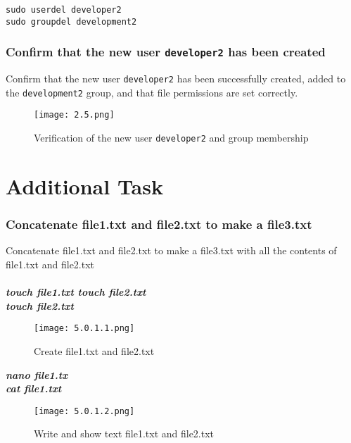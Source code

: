\documentclass[12pt]{article}
\begin{document}
\begin{verbatim}
sudo userdel developer2
sudo groupdel development2
\end{verbatim}

\subsubsection{Confirm that the new user \texttt{developer2} has been created}
Confirm that the new user \texttt{developer2} has been successfully created, added to the \texttt{development2} group, and that file permissions are set correctly.

\begin{figure}[H] %
    \centering
    \texttt{[image: 2.5.png]}
    \caption{Verification of the new user \texttt{developer2} and group membership}
    \label{fig:confirm-developer2}
\end{figure}


\section{Additional Task}

\subsubsection{Concatenate file1.txt and file2.txt to make a file3.txt}
Concatenate file1.txt and file2.txt to make a file3.txt with all the contents of file1.txt and file2.txt
\\ \\ \textbf{\textit {touch file1.txt touch file2.txt}}
\\ \textbf{\textit {touch file2.txt}}
\begin{figure}[H] %
    \centering
    \texttt{[image: 5.0.1.1.png]}
    \caption{Create file1.txt and file2.txt}
    \label{kaniz 5.0.1.1}
\end{figure}

\textbf{\textit {nano file1.tx}}
\\ \textbf{\textit {cat  file1.txt}}
\begin{figure}[H] %
    \centering
    \texttt{[image: 5.0.1.2.png]}
    \caption{Write and show text file1.txt and file2.txt}
    \label{kaniz 5.0.1.1}
\end{figure}
\end{document}
